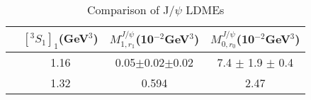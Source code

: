 \documentclass[aps,prc,preprint,superscriptaddress,showpacs,showkeys,amsmath]{revtex4-1}
\begin{document}
\begin{table}[h]
\caption{Comparison of J/$\psi$ LDMEs}
\begin{tabular}{|l|c|c|c|}
\hline            
                             &$[^3S_1]_{1}$(GeV$^3$)                     &$M^{J/\psi}_{1,r_{1}}$(10$^{-2}$GeV$^3$)    &$M^{J/\psi}_{0,r_{0}}$(10$^{-2}$GeV$^3$)  \\        
\hline
\cite{Ma:2010jj}             &1.16                                     &0.05$\pm$0.02$\pm$0.02              &7.4 $\pm$ 1.9 $\pm$ 0.4 \\
\cite{Butenschoen:2010rq}    &1.32                                     &0.594                               &2.47 \\
\hline
\end{tabular}
\label{table:LDMEJPsiNLO}
\end{table}









\ \\
\end{document}
